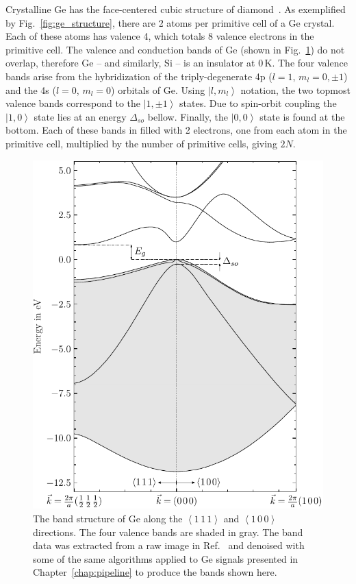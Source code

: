 Crystalline Ge has the face-centered cubic structure of diamond~\cite{kittel}. As exemplified by Fig.~\ref{fig:ge_structure}, there are 2 atoms per primitive cell of a Ge crystal. Each of these atoms has valence 4, which totals 8 valence electrons in the primitive cell. The valence and conduction bands of Ge (shown in Fig.~\ref{fig:band_structure}) do not overlap, therefore Ge -- and similarly, Si -- is an insulator at 0\,K. The four valence bands arise from the hybridization of the triply-degenerate 4p ($l = 1$, $m_l = 0, \pm1$) and the 4s ($l = 0$, $m_l = 0$) orbitals of Ge. Using $\left|l,m_l\right>$ notation, the two topmost valence bands correspond to the $\left|1,\pm1\right>$ states. Due to spin-orbit coupling the $\left|1,0\right>$ state lies at an energy $\Delta_{so}$ bellow. Finally, the $\left|0,0\right>$ state is found at the bottom. Each of these bands in filled with 2 electrons, one from each atom in the primitive cell, multiplied by the number of primitive cells, giving $2N$.
\begin{figure}[htb]
	\centering
	\includegraphics{figs/ge/ge_bands.pdf}
	\caption{The band structure of Ge along the $\left<1\,1\,1\right>$ and $\left<1\,0\,0\right>$ directions. The four valence bands are shaded in gray. The band data was extracted from a raw image in Ref.~\cite{knoll} and denoised with some of the same algorithms applied to Ge signals presented in Chapter~\ref{chap:pipeline} to produce the bands shown here.} 
	\label{fig:band_structure}
\end{figure}


